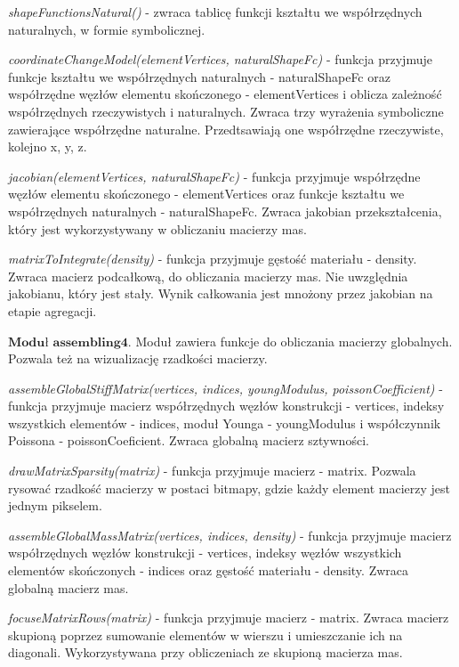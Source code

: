 \textit{shapeFunctionsNatural()} - zwraca tablicę funkcji kształtu we współrzędnych naturalnych, w formie symbolicznej.

\textit{coordinateChangeModel(elementVertices, naturalShapeFc)} - funkcja przyjmuje funkcje kształtu we współrzędnych naturalnych - naturalShapeFc  oraz współrzędne węzłów elementu skończonego - elementVertices i oblicza zależność współrzędnych rzeczywistych i naturalnych. Zwraca trzy wyrażenia symboliczne zawierające współrzędne naturalne. Przedtsawiają one współrzędne rzeczywiste, kolejno x, y, z.

\textit{jacobian(elementVertices, naturalShapeFc)} - funkcja przyjmuje współrzędne węzłów elementu skończonego - elementVertices oraz funkcje kształtu we współrzędnych naturalnych - naturalShapeFc. Zwraca jakobian przekształcenia, który jest wykorzystywany w obliczaniu macierzy mas.

\textit{matrixToIntegrate(density)} - funkcja przyjmuje gęstość materiału - density. Zwraca macierz podcałkową, do obliczania macierzy mas. Nie uwzględnia jakobianu, który jest stały. Wynik całkowania jest mnożony przez jakobian na etapie agregacji.

 \( \textbf{Moduł assembling4} \).
Moduł zawiera funkcje do obliczania macierzy globalnych. Pozwala też na wizualizację rzadkości macierzy.

\textit{assembleGlobalStiffMatrix(vertices, indices, youngModulus, poissonCoefficient)} - funkcja przyjmuje macierz współrzędnych węzłów konstrukcji - vertices, indeksy wszystkich elementów - indices, moduł Younga - youngModulus i współczynnik Poissona - poissonCoeficient. Zwraca globalną macierz sztywności.

\textit{drawMatrixSparsity(matrix)} - funkcja przyjmuje macierz - matrix. Pozwala rysować rzadkość macierzy w postaci bitmapy, gdzie każdy element macierzy jest jednym pikselem.

\textit{assembleGlobalMassMatrix(vertices, indices, density)} - funkcja przyjmuje macierz współrzędnych węzłów konstrukcji - vertices, indeksy węzłów wszystkich elementów skończonych - indices oraz gęstość materiału - density. Zwraca globalną macierz mas.

\textit{focuseMatrixRows(matrix)} - funkcja przyjmuje macierz - matrix. Zwraca macierz skupioną poprzez sumowanie elementów w wierszu i umieszczanie ich na diagonali. Wykorzystywana przy obliczeniach ze skupioną macierza mas.
